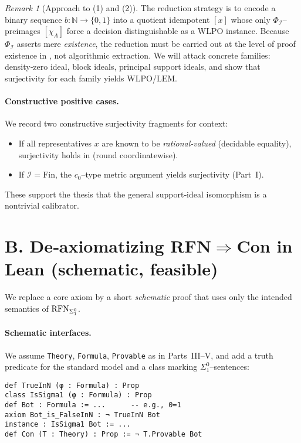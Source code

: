 \documentclass[11pt]{article}
\theoremstyle{definition}
\theoremstyle{remark}
\newtheorem{remark}[theorem]{Remark}
\newcommand{\WLPO}{\mathrm{WLPO}}
\newcommand{\LEM}{\mathrm{LEM}}
\newcommand{\BISH}{\mathrm{BISH}}
\begin{document}
\begin{remark}[Approach to (1) and (2)]
The reduction strategy is to encode a binary sequence $b:\mathbb N\to\{0,1\}$ into a quotient idempotent $[x]$ whose only $\Phi_{\mathcal I}$–preimages $[\chi_A]$ force a decision distinguishable as a \(\WLPO\) instance. Because \(\Phi_{\mathcal I}\) asserts mere \emph{existence}, the reduction must be carried out at the level of proof existence in \BISH, not algorithmic extraction. We will attack concrete families: density‑zero ideal, block ideals, principal support ideals, and show that surjectivity for each family yields \(\WLPO\)/\(\LEM\).
\end{remark}

\paragraph{Constructive positive cases.}
We record two constructive surjectivity fragments for context:
\begin{itemize}
\item If all representatives $x$ are known to be \emph{rational‑valued} (decidable equality), surjectivity holds in \BISH (round coordinatewise).
\item If $\mathcal I=\mathrm{Fin}$, the $c_0$–type metric argument yields surjectivity (Part~I).
\end{itemize}
These support the thesis that the general support‑ideal isomorphism is a nontrivial calibrator.

\section{B. De‑axiomatizing RFN\texorpdfstring{$\Rightarrow$}{=>}Con in Lean (schematic, feasible)}

We replace a core axiom by a short \emph{schematic} proof that uses only the intended semantics of $\mathrm{RFN}_{\Sigma^0_1}$.

\paragraph{Schematic interfaces.}
We assume \texttt{Theory}, \texttt{Formula}, \texttt{Provable} as in Parts~III–V, and add a truth predicate for the standard model and a class marking $\Sigma^0_1$–sentences:
\begin{verbatim}
def TrueInN (φ : Formula) : Prop
class IsSigma1 (φ : Formula) : Prop
def Bot : Formula := ...      -- e.g., 0=1
axiom Bot_is_FalseInN : ¬ TrueInN Bot
instance : IsSigma1 Bot := ...
def Con (T : Theory) : Prop := ¬ T.Provable Bot
\end{verbatim}
\end{document}

